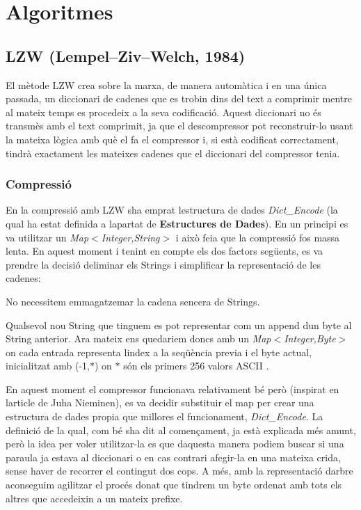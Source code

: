 \section*{Algoritmes}

\subsection*{L\+ZW (Lempel–\+Ziv–\+Welch, 1984)}

El mètode L\+ZW crea sobre la marxa, de manera automàtica i en una única passada, un diccionari de cadenes que es trobin dins del text a comprimir mentre al mateix temps es procedeix a la seva codificació. Aquest diccionari no és transmès amb el text comprimit, ja que el descompressor pot reconstruir-\/lo usant la mateixa lògica amb què el fa el compressor i, si està codificat correctament, tindrà exactament les mateixes cadenes que el diccionari del compressor tenia.

\subsubsection*{Compressió}

En la compressió amb L\+ZW s\textquotesingle{}ha emprat l\textquotesingle{}estructura de dades {\itshape Dict\+\_\+\+Encode} (la qual ha estat definida a l\textquotesingle{}apartat de {\bfseries Estructures de Dades}). En un principi es va utilitzar un {\itshape Map$<$Integer,String$>$} i això feia que la compressió fos massa lenta. En aquest moment i tenint en compte els dos factors següents, es va prendre la decisió d\textquotesingle{}eliminar els Strings i simplificar la representació de les cadenes\+:
\begin{DoxyItemize}
\item No necessitem emmagatzemar la cadena sencera de Strings.
\item Qualsevol nou String que tinguem es pot representar com un append d\textquotesingle{}un byte al String anterior. Ara mateix ens quedariem doncs amb un {\itshape Map$<$Integer,Byte$>$} on cada entrada representa l\textquotesingle{}index a la seqüència previa i el byte actual, inicialitzat amb (-\/1,$\ast$) on $\ast$ són els primers 256 valors A\+S\+C\+II .
\end{DoxyItemize}

En aquest moment el compressor funcionava relativament bé però (inspirat en l\textquotesingle{}article de Juha Nieminen), es va decidir substituir el map per crear una estructura de dades propia que millores el funcionament, {\itshape Dict\+\_\+\+Encode}. La definició de la qual, com bé s\textquotesingle{}ha dit al començament, ja està explicada més amunt, però la idea per voler utilitzar-\/la es que d\textquotesingle{}aquesta manera podiem buscar si una paraula ja estava al diccionari o en cas contrari afegir-\/la en una mateixa crida, sense haver de recorrer el contingut dos cops. A més, amb la representació d\textquotesingle{}arbre aconseguim agilitzar el procés donat que tindrem un byte ordenat amb tots els altres que accedeixin a un mateix prefixe.

